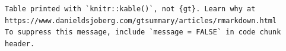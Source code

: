 \documentclass[
  letterpaper,
  DIV=11,
  numbers=noendperiod,
  oneside]{scrreprt}
\newenvironment{Shaded}{\begin{snugshade}}{\end{snugshade}}
\newcommand{\AttributeTok}[1]{\textcolor[rgb]{0.40,0.45,0.13}{#1}}
\newcommand{\FunctionTok}[1]{\textcolor[rgb]{0.28,0.35,0.67}{#1}}
\newcommand{\NormalTok}[1]{\textcolor[rgb]{0.00,0.23,0.31}{#1}}
\newcommand{\SpecialCharTok}[1]{\textcolor[rgb]{0.37,0.37,0.37}{#1}}
\newcommand{\StringTok}[1]{\textcolor[rgb]{0.13,0.47,0.30}{#1}}
\begin{document}
\begin{Shaded}
\end{Shaded}

\begin{verbatim}
Table printed with `knitr::kable()`, not {gt}. Learn why at
https://www.danieldsjoberg.com/gtsummary/articles/rmarkdown.html
To suppress this message, include `message = FALSE` in code chunk header.
\end{verbatim}
\end{document}

